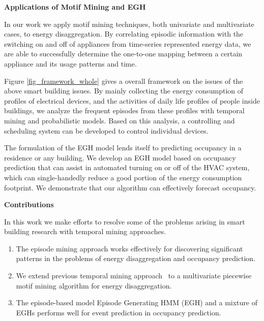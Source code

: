 \textbf{Applications of Motif Mining and EGH}

In our work we apply motif mining techniques, both univariate and multivariate cases, to energy disaggregation. By correlating episodic information with the switching on and off of appliances from time-series represented energy data, we are able to successfully determine the one-to-one mapping between a certain appliance and its usage patterns and time. 


Figure \ref{fig_framework_whole} gives a overall framework on the issues of the above smart building issues. 
By mainly collecting the energy consumption of profiles of electrical devices, %
and the activities of daily life profiles of people inside buildings, we analyze the frequent episodes from these profiles with temporal mining and probabilistic models. Based on this analysis, a controlling and scheduling system can be developed to control individual devices. 

The formulation of the EGH model lends itself to predicting occupancy in a residence or any building. We develop an EGH model based on occupancy prediction that can assist in automated turning on or off of the HVAC system, which can single-handedly reduce a good portion of the energy consumption footprint. We demonstrate that our algorithm can effectively forecast occupancy.  

\textbf{Contributions}

In this work we make efforts to resolve some of the problems arising in smart building research with 
temporal mining approaches.
\begin{enumerate}
	\item The episode mining approach works effectively for discovering significant patterns in the problems of energy disaggregation and occupancy prediction. 
	\item We extend previous temporal mining approach~\cite{shao2013temporal} to a multivariate piecewise motif mining algorithm for energy disaggregation. 
	\item The episode-based model Episode Generating HMM (EGH) and a mixture of EGHs performs well for event prediction in occupancy prediction. 
\end{enumerate}

